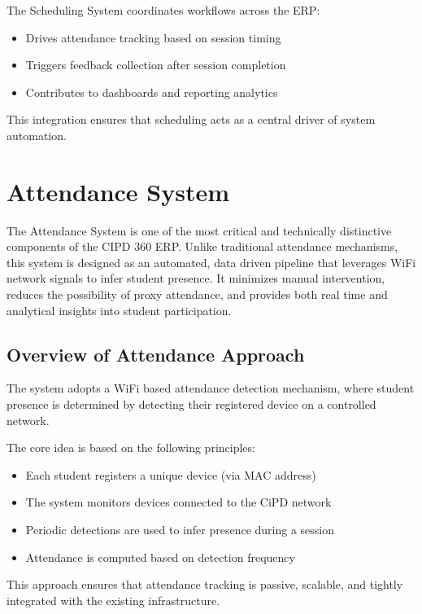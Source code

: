 The Scheduling System coordinates workflows across the ERP:

\begin{itemize}
    \item Drives attendance tracking based on session timing
    \item Triggers feedback collection after session completion
    \item Contributes to dashboards and reporting analytics
\end{itemize}

This integration ensures that scheduling acts as a central driver of system automation.

\section{Attendance System}

The Attendance System is one of the most critical and technically distinctive components of the CIPD
360 ERP. Unlike traditional attendance mechanisms, this system is designed as an automated, data
driven pipeline that leverages WiFi network signals to infer student presence. It minimizes manual
intervention, reduces the possibility of proxy attendance, and provides both real time and analytical
insights into student participation.

\subsection{Overview of Attendance Approach}

The system adopts a WiFi based attendance detection mechanism, where student presence is
determined by detecting their registered device on a controlled network.

The core idea is based on the following principles:

\begin{itemize}
    \item Each student registers a unique device (via MAC address)
    \item The system monitors devices connected to the CiPD network
    \item Periodic detections are used to infer presence during a session
    \item Attendance is computed based on detection frequency
\end{itemize}

This approach ensures that attendance tracking is passive, scalable, and tightly integrated with the
existing infrastructure.

